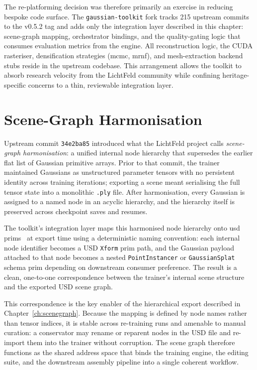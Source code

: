 The re-platforming decision was therefore primarily an exercise in reducing bespoke code surface.
The \texttt{gaussian-toolkit} fork tracks 215 upstream commits to the v0.5.2 tag and adds only the
integration layer described in this chapter: scene-graph mapping, orchestrator bindings, and the
quality-gating logic that consumes evaluation metrics from the engine.
All reconstruction logic, the CUDA rasteriser, densification strategies (\acrshort{mcmc},
\acrshort{mrnf}), and mesh-extraction backend stubs reside in the upstream codebase.
This arrangement allows the toolkit to absorb research velocity from the LichtFeld community
while confining heritage-specific concerns to a thin, reviewable integration layer.

\section{Scene-Graph Harmonisation}
\label{sec:lf-scenegraph}

Upstream commit \texttt{34e2ba85} introduced what the LichtFeld project calls
\emph{scene-graph harmonisation}: a unified internal node hierarchy that supersedes the earlier
flat list of Gaussian primitive arrays.
Prior to that commit, the trainer maintained Gaussians as unstructured parameter tensors with no
persistent identity across training iterations; exporting a scene meant serialising the full tensor
state into a monolithic \texttt{.ply} file.
After harmonisation, every Gaussian is assigned to a named node in an acyclic hierarchy, and the
hierarchy itself is preserved across checkpoint saves and resumes.

The toolkit's integration layer maps this harmonised node hierarchy onto \acrshort{usd}
prims~\parencite{Pixar2019} at export time using a deterministic naming convention:
each internal node identifier becomes a USD \texttt{Xform} prim path, and the Gaussian
payload attached to that node becomes a nested \texttt{PointInstancer} or
\texttt{GaussianSplat} schema prim depending on downstream consumer preference.
The result is a clean, one-to-one correspondence between the trainer's internal scene structure
and the exported USD scene graph.

This correspondence is the key enabler of the hierarchical export described in
Chapter~\ref{ch:scenegraph}.
Because the mapping is defined by node names rather than tensor indices, it is stable across
re-training runs and amenable to manual curation: a conservator may rename or reparent nodes in the
USD file and re-import them into the trainer without corruption.
The scene graph therefore functions as the shared address space that binds the training engine,
the editing suite, and the downstream assembly pipeline into a single coherent workflow.

